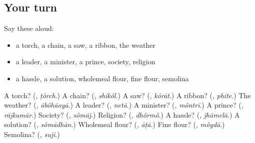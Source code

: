 \subsection*{Your turn}
Say these aloud:

\begin{itemize}
\raggedright
  \item a torch, a chain, a saw, a ribbon, the weather
  \item a leader, a minister, a prince, society, religion
  \item a hassle, a solution, wholemeal flour, fine flour, semolina
\end{itemize}

\begin{tcolorbox}[breakable,colback=teal!4,colframe=teal!35!black,title={Before you move on}]
A torch? (\textbf{}, \emph{ṭôrch}.) A chain? (\textbf{}, \emph{shikôl}.) A saw? (\textbf{}, \emph{kôrāt}.) A ribbon? (\textbf{}, \emph{phite}.) The weather? (\textbf{}, \emph{ābôhāoyā}.) A leader? (\textbf{}, \emph{netā}.) A minister? (\textbf{}, \emph{môntrī}.) A prince? (\textbf{}, \emph{rājkumār}.) Society? (\textbf{}, \emph{sômāj}.) Religion? (\textbf{}, \emph{dhôrmô}.) A hassle? (\textbf{}, \emph{jhāmelā}.) A solution? (\textbf{}, \emph{sômādhān}.) Wholemeal flour? (\textbf{}, \emph{āṭā}.) Fine flour? (\textbf{}, \emph{môydā}.) Semolina? (\textbf{}, \emph{suji}.)
\end{tcolorbox}
